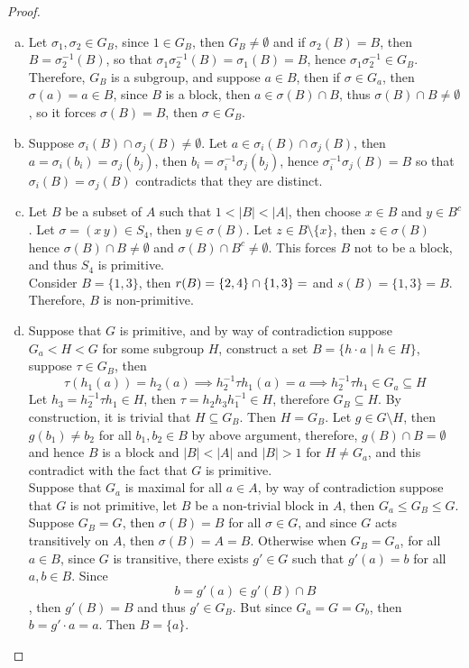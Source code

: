 \documentclass{article}
\begin{document}
\begin{proof}
    \begin{enumerate}[(a)]
        \item Let $\sigma_1, \sigma_2 \in G_B$, since $1 \in G_B$, then $G_B \neq \emptyset$ and if $\sigma_2(B)=B$, then $B =\sigma^{-1}_2(B)$, so that $\sigma_1\sigma_2^{-1}(B)=\sigma_1(B )=B$, hence $\sigma_1\sigma_2^{-1}\in G_B$. Therefore, $G_B$ is a subgroup, and suppose $a \in B$, then if $\sigma\in G_a$, then $\sigma(a)=a \in B$, since $B$ is a block, then 
        $a \in \sigma(B)\cap B$, thus $\sigma(B)\cap B \neq \emptyset$, so it forces $\sigma(B)=B$, then $\sigma\in G_B$.
        \item Suppose $\sigma_i(B)\cap \sigma_j(B)\neq \emptyset$. Let $a \in \sigma_i(B)\cap \sigma_j(B)$, then $a = \sigma_i(b_i)=\sigma_j(b_j)$, then $b_i = \sigma_i^{-1}\sigma_j(b_j)$, hence $\sigma_i^{-1}\sigma_j(B)=B$ so that $\sigma_i(B)=\sigma_j (B)$ contradicts that they are distinct.
        \item Let $B$ be a subset of $A$ such that $1<|B|<|A|$, then choose $x \in B$ and $y \in B^c$. Let $\sigma = (x \hspace{2pt} y)\in S_4$, then  $y \in \sigma (B)$. Let $z \in B\setminus \{x\}$, then $z \in \sigma(B)$ hence $\sigma(B)\cap B \neq \emptyset$ and $\sigma(B)\cap B^c \neq \emptyset$. This forces $B$ not to be a block, and thus $S_4$ is primitive.\\
        Consider $B=\{1, 3\}$, then $r(B)=\{2, 4\}\cap \{1, 3\}=\empty$ and $s(B)=\{1, 3\}=B$. Therefore, $B$ is non-primitive.
        \item Suppose that $G$ is primitive, and by way of contradiction suppose $G_a < H<G$ for some subgroup $H$, construct a set $B=\{h \cdot a\mid h \in H\}$, suppose $\tau \in G_B$,  then  
        \[
        \tau (h_1(a)) =h_2(a) \implies h_2^{-1}\tau h_1(a)=a \implies h_2^{-1}\tau h_1 \in G_a \subseteq H
        \]
        Let $h_3 =h_2^{-1}\tau h_1\in H$, then $\tau = h_2h_3h_1^{-1}\in H$, therefore $G_B \subseteq H$. By construction, it is trivial that $H \subseteq G_B$. Then $H=G_B$. Let $g\in G \setminus H$, then $g(b_1)\neq b_2$ for all $b_1, b_2 \in B$ by above argument, therefore, $g(B)\cap B =\emptyset$ and hence $B$ is a block and $|B|<|A|$ and $|B|>1$ for $H \neq G_a$, and this contradict with the fact that $G$ is primitive.\\
        Suppose that $G_a$ is maximal for all $a \in A$, by way of contradiction suppose that $G$ is not primitive, let $B$ be a non-trivial block in $A$, then $G_a \leq G_B \leq G$. Suppose $G_B=G$, then $\sigma(B)=B$ for all $\sigma \in G$, and since $G$ acts transitively on $A$, then $\sigma(B)=A=B$. Otherwise when $G_B =G_a$, for all $a \in B$, since $G$ is transitive, there exists $g' \in G$ such that $g'(a) = b$ for all $a, b\in B$. Since
        \[
        b=g'(a)\in g'(B)\cap B 
        \]
        , then $g'(B)=B$ and thus $g'\in G_B$. But since $G_a=G=G_b$, then $b= g'\cdot a =a$. Then $B =\{a\}$.
    \end{enumerate}
\end{proof}
\end{document}
